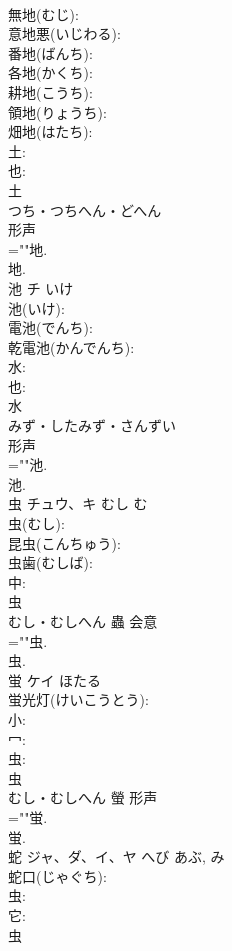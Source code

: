 \documentclass[8pt]{extreport}
\begin{document}
\begin{CJK}{UTF8}{min}
\\	無地(むじ): 
\\	意地悪(いじわる): 
\\	番地(ばんち): 
\\	各地(かくち): 
\\	耕地(こうち): 
\\	領地(りょうち): 
\\	畑地(はたち): 
\\	土: 
\\	也: 
\\	土	
\\	つち・つちへん・どへん	
\\	形声 
\\	=""地.
\\	地.
\\	池	チ	いけ		
\\	池(いけ): 
\\	電池(でんち): 
\\	乾電池(かんでんち): 
\\	水: 
\\	也: 
\\	水	
\\	みず・したみず・さんずい	
\\	形声 
\\	=""池.
\\	池.
\\	虫	チュウ、キ	むし	む	
\\	虫(むし): 
\\	昆虫(こんちゅう): 
\\	虫歯(むしば): 
\\	中: 
\\	虫	
\\	むし・むしへん	蟲	会意 
\\	=""虫.
\\	虫.
\\	蛍	ケイ	ほたる		
\\	蛍光灯(けいこうとう): 
\\	小: 
\\	冖: 
\\	虫: 
\\	虫	
\\	むし・むしへん	螢	形声 
\\	=""蛍.
\\	蛍.
\\	蛇	ジャ、ダ、イ、ヤ	へび	あぶ, み	
\\	蛇口(じゃぐち): 
\\	虫: 
\\	它: 
\\	虫	

\end{CJK}
\end{document}

